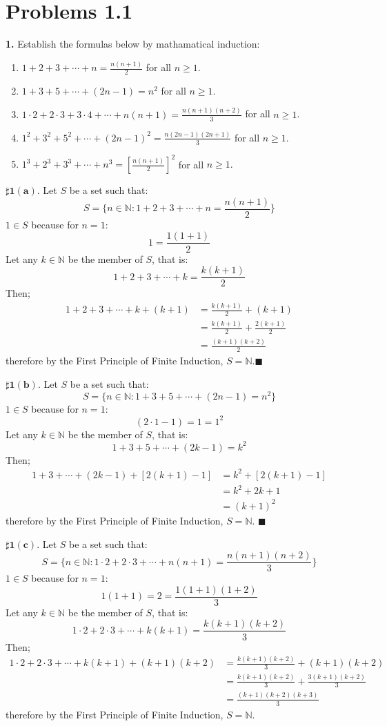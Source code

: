 \documentclass[atbegshi, chapter]{memoir}
\begin{document}
\section*{Problems 1.1}
\textbf{1. }Establish the formulas below by mathamatical induction:
\begin{enumerate}[label=(\alph*)]
  \item $1+2+3+\cdots+n=\frac{n(n+1)}{2}$ for all $n\geq 1.$
  \item $1+3+5+\cdots+(2n-1)=n^2$ for all $n\geq 1$.
  \item $1\cdot 2 + 2\cdot 3 + 3\cdot 4 + \cdots +n(n+1)=\frac{n(n+1)(n+2)}{3}$
    for all $n\geq 1$.
  \item $1^2+3^2+5^2+\cdots+(2n-1)^2=\frac{n(2n-1)(2n+1)}{3}$
    for all $n\geq 1$.
  \item $1^3+2^3+3^3+\cdots +n^3 = \left[\frac{n(n+1)}{2}\right]^2$
    for all $n\geq 1.$
\end{enumerate}
\hfill\break
$\pmb{\sharp 1(a).}$ Let $S$ be a set such that:
\[
  S = \bigg\lbrace n\in\mathbb{N}:1+2+3+\cdots+n = \frac{n(n+1)}{2}\bigg\rbrace
\]
$1\in S$ because for $n=1$:
\[
  1 = \frac{1(1+1)}{2}
\]
Let any $k\in\mathbb{N}$ be the member of $S$, that is:
\[
  1+2+3+\cdots+k = \frac{k(k+1)}{2}
\]
Then;
\begin{align*}
  1+2+3+\cdots+k+(k+1)&=\frac{k(k+1)}{2}+(k+1) \\
                   &=\frac{k(k+1)}{2}+\frac{2(k+1)}{2} \\
                   &=\frac{(k+1)(k+2)}{2}
\end{align*}
therefore by the First Principle of Finite Induction, 
$S=\mathbb{N}$.\hfill$\blacksquare$

\hfill\break
$\pmb{\sharp 1(b).}$ Let $S$ be a set such that:
\[
  S = \bigg\lbrace n\in\mathbb{N}: 1+3+5+\cdots+(2n-1)=n^2\bigg\rbrace
\]
$1\in S$ because for $n=1$:
\[
  (2\cdot 1-1)=1=1^2
\]
Let any $k\in\mathbb{N}$ be the member of $S$, that is:
\[
  1+3+5+\cdots+(2k-1) = k^2
\]
Then;
\begin{align*}
  1+3+\cdots+(2k-1)+[2(k+1)-1] &= k^2+[2(k+1)-1] \\
                               &= k^2+2k+1 \\
                               &= (k+1)^2
\end{align*}
therefore by the First Principle of Finite Induction, $S=\mathbb{N}$.
\hfill$\blacksquare$

\hfill\break
$\pmb{\sharp 1(c).}$ Let $S$ be a set such that:
\[
  S = \bigg\lbrace n\in\mathbb{N}:1\cdot 2+2\cdot3 +\cdots + n(n+1)
  =\frac{n(n+1)(n+2)}{3}\bigg\rbrace
\]
$1\in S$ because for $n=1$:
\[
  1(1+1) = 2 = \frac{1(1+1)(1+2)}{3}
\]
Let any $k\in\mathbb{N}$ be the member of $S$, that is:
\[
  1\cdot2+ 2\cdot3 +\cdots+k(k+1)=\frac{k(k+1)(k+2)}{3}
\]
Then;
\begin{align*}
  1\cdot2+2\cdot3+\cdots+k(k+1)+(k+1)(k+2)&=\frac{k(k+1)(k+2)}{3}+(k+1)(k+2)\\
      &=\frac{k(k+1)(k+2)}{3}+\frac{3(k+1)(k+2)}{3} \\
      &=\frac{(k+1)(k+2)(k+3)}{3}
\end{align*}
therefore by the First Principle of Finite Induction, $S=\mathbb{N}$.
\end{document}
